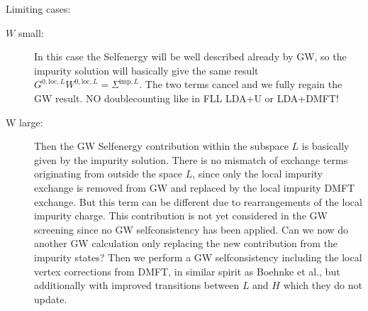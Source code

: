 \documentclass[12pt,a4paper]{scrartcl}
\numberwithin{equation}{section}
\newcommand{\cng}[1]{{\color{red}#1}}
\begin{document}
Limiting cases:
\begin{description}
\item[$W$ small:] In this case the Selfenergy will be well described already by GW, so the impurity solution
will basically give the same result $G^{0,\mathrm{loc},L}W^{0,\mathrm{loc},L} = \Sigma^{\mathrm{imp},L}$.
The two terms cancel and we fully regain the GW result. \cng{NO doublecounting like in FLL LDA+U or LDA+DMFT!}
\item[W large:] Then the GW Selfenergy contribution within the subspace $L$ is basically given by the impurity solution.
There is no mismatch of exchange terms originating from outside the space $L$, since only the local impurity exchange
is removed from GW and replaced by the local impurity DMFT exchange. But this term can be different due to rearrangements
of the local impurity charge. This contribution is not yet considered in the GW screening since no GW selfconsistency
has been applied.
\cng{Can we now do another GW calculation only replacing the new contribution from the impurity states?
Then we perform a GW selfconsistency including the  local vertex corrections from DMFT, in similar spirit as Boehnke et al., but additionally with improved transitions between
$L$ and $H$ which they do not update.}
\end{description}


\clearpage
\end{document}
